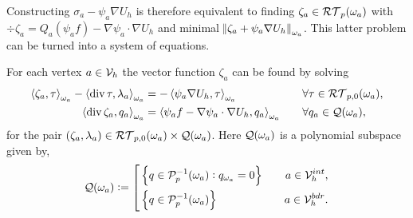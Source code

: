 \documentclass[thesis.tex]{subfiles}
\begin{document}
Constructing $\sigma_a - \psi_a\nabla U_h$ is therefore equivalent to finding $\zeta_a \in \mathcal{RT}_p(\omega_a)$ with
$\div \zeta_a = Q_a(\psi_af) - \nabla \psi_a \cdot \nabla U_h$ and minimal $\norm{\zeta_a + \psi_a \nabla U_h}_{\omega_a}$.
This latter problem can be turned into a system of equations. 
\begin{thm}
  For each vertex $a \in \mathcal{V}_h$ the vector function $\zeta_a$ can be found by solving
  \begin{alignat}{3}
    \left \langle \zeta_a, \tau \right \rangle_{\omega_a} - \left \langle \operatorname{div} \tau, \lambda_a \right \rangle_{\omega_a} &= - \left \langle \psi_a \nabla U_h, \tau \right \rangle_{\omega_a} && \quad \forall \tau \in \mathcal{RT}_{p,0}(\omega_a),\label{eq:systemzeta1}\\
    \left \langle \operatorname{div} \zeta_a, q_a \right \rangle_{\omega_a} &= \left \langle \psi_a f - \nabla \psi_a \cdot \nabla U_h, q_a \right \rangle_{\omega_a} && \quad \forall q_a \in \mathcal{Q}(\omega_a), \label{eq:systemzeta2}
  \end{alignat}
  for the pair $(\zeta_a, \lambda_a) \in \mathcal{RT}_{p,0}(\omega_a) \times \mathcal{Q}(\omega_a)$.
  Here $\mathcal{Q}(\omega_a)$ is a polynomial subspace given by, 
  \[
    \mathcal{Q}(\omega_a) := \left[\begin{aligned}
        &\set{q \in \mathcal{P}_p^{-1}(\omega_a) : q_{\omega_a} = 0}  &\quad a \in \mathcal{V}_h^{int},\\
        &\set{q \in\mathcal{P}_p^{-1}(\omega_a)}&\quad a \in \mathcal{V}_h^{bdr}.
      \end{aligned}
      \right.
  \]
\end{thm}
\end{document}
